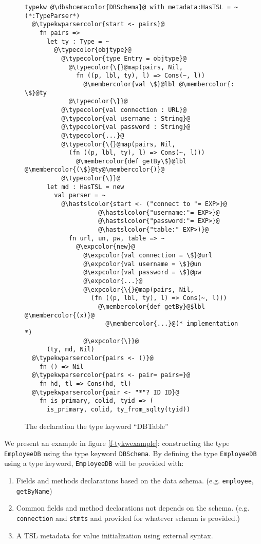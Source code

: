 \documentclass{sig-alternate}
\newcommand{\typekwparsercolor}[1]{\textcolor[HTML]{7C803E}{#1}}
\newcommand{\expcolor}[1]{\textcolor[HTML]{FF0033}{#1}}
\newcommand{\membercolor}[1]{\textcolor[HTML]{FF6600}{#1}}
\newcommand{\typecolor}[1]{\textcolor[HTML]{660066}{#1}}
\newcommand{\hastslcolor}[1]{\textcolor[HTML]{002FC9}{#1}}
\newcommand{\dbshcemacolor}[1]{\textcolor[HTML]{5AC3D1}{#1}}
\newcommand{\mycaption}[1]{\vspace{-4px}\caption{#1}\vspace{-2px}}
\begin{document}
\begin{figure}[ht]
\begin{lstlisting}[style=wyvern]
typekw @\dbshcemacolor{DBSchema}@ with metadata:HasTSL = ~ (*:TypeParser*)
  @\typekwparsercolor{start <- pairs}@
    fn pairs =>
      let ty : Type = ~
        @\typecolor{objtype}@
          @\typecolor{type Entry = objtype}@
            @\typecolor{\{}@map(pairs, Nil, 
              fn ((p, lbl, ty), l) => Cons(~, l))
                @\membercolor{val \$}@lbl @\membercolor{:  \$}@ty
            @\typecolor{\}}@
          @\typecolor{val connection : URL}@
          @\typecolor{val username : String}@
          @\typecolor{val password : String}@
          @\typecolor{...}@
          @\typecolor{\{}@map(pairs, Nil, 
            (fn ((p, lbl, ty), l) => Cons(~, l)))
              @\membercolor{def getBy\$}@lbl @\membercolor{(\$}@ty@\membercolor{)}@
          @\typecolor{\}}@
      let md : HasTSL = new 
        val parser = ~
          @\hastslcolor{start <- ("connect to "= EXP>}@
                    @\hastslcolor{"username:"= EXP>}@
                    @\hastslcolor{"password:"= EXP>}@
                    @\hastslcolor{"table:" EXP>)}@
            fn url, un, pw, table => ~
              @\expcolor{new}@ 
                @\expcolor{val connection = \$}@url
                @\expcolor{val username = \$}@un
                @\expcolor{val password = \$}@pw
                @\expcolor{...}@
                @\expcolor{\{}@map(pairs, Nil, 
                  (fn ((p, lbl, ty), l) => Cons(~, l)))
                    @\membercolor{def getBy}@$lbl @\membercolor{(x)}@ 
                      @\membercolor{...}@(* implementation *)
                @\expcolor{\}}@
      (ty, md, Nil)
  @\typekwparsercolor{pairs <- ()}@
    fn () => Nil 
  @\typekwparsercolor{pairs <- pair= pairs=}@
    fn hd, tl => Cons(hd, tl)
  @\typekwparsercolor{pair <- "*"? ID ID}@
    fn is_primary, colid, tyid => (
      is_primary, colid, ty_from_sqlty(tyid))
\end{lstlisting}
\mycaption{The declaration the type keyword ``DBTable''}
\label{typekw-example-1}
\end{figure}
We present an example in figure \ref{f-tykwexample}: constructing the type \verb|EmployeeDB| using the type keyword \verb|DBSchema|. By defining the type \verb|EmployeeDB| using a type keyword, \verb|EmployeeDB| will be provided with:
\begin{enumerate}\setlength{\itemsep}{0pt}
\item Fields and methods declarations based on the data schema. (e.g. \verb|employee|, \verb|getByName|)
\item Common fields and method declarations not depends on the schema. (e.g. \verb|connection| and \verb|stmts| and provided for whatever schema is provided.)
\item A TSL metadata for value initialization using external syntax. 
\end{enumerate}
\end{document}
